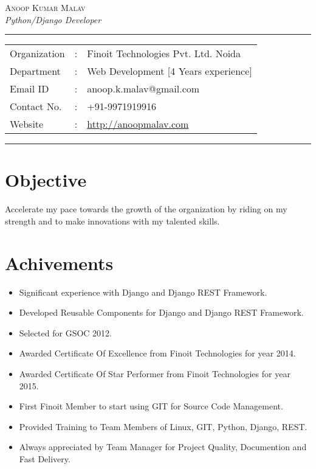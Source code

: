 \documentclass[11pt]{article}
\begin{document}
\begin{center}

\textsc{\Large Anoop Kumar Malav}
 \\[0.1cm]

\textit{\large Python/Django Developer} \\
\addvspace{0.04cm}
\rule[0.07cm]{17.52cm}{0.01cm}
\begin{tabular}{l c l}
Organization      &:& Finoit Technologies Pvt. Ltd. Noida \\
Department        &:& Web Development [4 Years experience]\\
Email ID          &:& anoop.k.malav@gmail.com \\
Contact No.       &:& +91-9971919916 \\
Website           &:& \href{http://anoopmalav.com}{http://anoopmalav.com}
\end{tabular}

\addvspace{0.02cm}
\rule[0.02cm]{17.52cm}{0.01cm}
\end{center}

\section*{Objective}
Accelerate my pace towards the growth of the organization by riding on my strength and
to make innovations with my talented skills.

\section*{Achivements}

\begin{itemize}
 \item Significant experience with Django and Django REST Framework.
 \item Developed Reusable Components for Django and Django REST Framework.
 \item Selected for GSOC 2012.
 \item Awarded Certificate Of Excellence from Finoit Technologies for year 2014.
 \item Awarded Certificate Of Star Performer from Finoit Technologies for year 2015.
 \item First Finoit Member to start using GIT for Source Code Management.
 \item Provided Training to Team Members of Linux, GIT, Python, Django, REST.
 \item Always appreciated by Team Manager for Project Quality, Documention and Fast Delivery.
\end{itemize}
\end{document}
